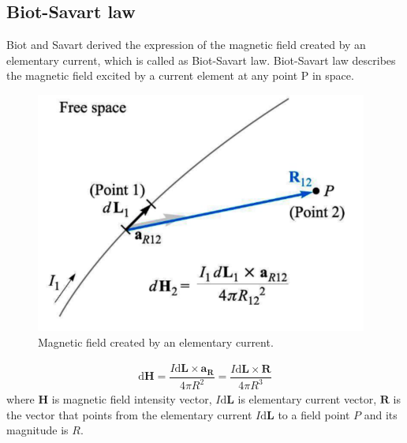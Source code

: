 \documentclass[journal,twocolumn,letterpaper]{IEEEJERM}
\begin{document}
\subsection{Biot-Savart law}
Biot and Savart derived the expression of the magnetic field created by an elementary current, which is called as Biot-Savart law. Biot-Savart law describes the magnetic field excited by a current element at any point P in space.
\begin{figure}[H]   
	\centering	        \includegraphics[width=0.8\linewidth]{Fig1.png}
	\caption{Magnetic field created by an elementary current.}	  
	\label{fig1} 
\end{figure}
\begin{align}
\mathrm{d}\mathbf{H}=\dfrac{I\mathrm{d}\mathbf{L}\times \mathbf{a_R}}{4\pi R^2}=\dfrac{I\mathrm{d}\mathbf{L}\times \mathbf{R}}{4\pi R^3}
\end{align}
where $\mathbf{H}$ is magnetic field intensity vector, $I\mathrm{d}\mathbf{L}$ is elementary current vector, $\mathbf{R}$ is the vector that points from the elementary current $I\mathrm{d}\mathbf{L}$ to a field point $P$ and its magnitude is $R$.
\end{document}
